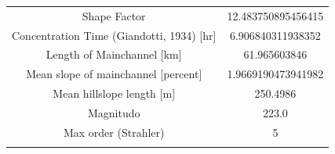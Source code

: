 \documentclass[11pt,]{article}
\begin{document}
\begin{longtable}[]{@{}cc@{}}
\begin{minipage}[t]{0.65\columnwidth}\centering\strut
Shape Factor\strut
\end{minipage} & \begin{minipage}[t]{0.29\columnwidth}\centering\strut
12.483750895456415\strut
\end{minipage}\tabularnewline
\begin{minipage}[t]{0.65\columnwidth}\centering\strut
Concentration Time (Giandotti, 1934) {[}hr{]}\strut
\end{minipage} & \begin{minipage}[t]{0.29\columnwidth}\centering\strut
6.906840311938352\strut
\end{minipage}\tabularnewline
\begin{minipage}[t]{0.65\columnwidth}\centering\strut
Length of Mainchannel {[}km{]}\strut
\end{minipage} & \begin{minipage}[t]{0.29\columnwidth}\centering\strut
61.965603846\strut
\end{minipage}\tabularnewline
\begin{minipage}[t]{0.65\columnwidth}\centering\strut
Mean slope of mainchannel {[}percent{]}\strut
\end{minipage} & \begin{minipage}[t]{0.29\columnwidth}\centering\strut
1.9669190473941982\strut
\end{minipage}\tabularnewline
\begin{minipage}[t]{0.65\columnwidth}\centering\strut
Mean hillslope length {[}m{]}\strut
\end{minipage} & \begin{minipage}[t]{0.29\columnwidth}\centering\strut
250.4986\strut
\end{minipage}\tabularnewline
\begin{minipage}[t]{0.65\columnwidth}\centering\strut
Magnitudo\strut
\end{minipage} & \begin{minipage}[t]{0.29\columnwidth}\centering\strut
223.0\strut
\end{minipage}\tabularnewline
\begin{minipage}[t]{0.65\columnwidth}\centering\strut
Max order (Strahler)\strut
\end{minipage} & \begin{minipage}[t]{0.29\columnwidth}\centering\strut
5\strut
\end{minipage}\tabularnewline
\begin{minipage}[t]{0.65\columnwidth}\centering\strut

\end{minipage}
\end{longtable}
\end{document}
